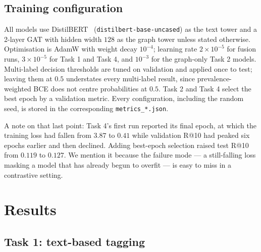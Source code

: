 \documentclass[conference]{IEEEtran}
\begin{document}
\subsection{Training configuration}
All models use DistilBERT~\cite{distilbert} (\texttt{distilbert-base-uncased}) as the text tower
and a 2-layer GAT with hidden width $128$ as the graph tower unless stated
otherwise. Optimisation is AdamW with weight decay $10^{-4}$; learning rate
$2\times10^{-5}$ for fusion runs, $3\times10^{-5}$ for Task 1 and Task 4, and
$10^{-3}$ for the graph-only Task 2 models. Multi-label decision thresholds are
tuned on validation and applied once to test; leaving them at $0.5$
understates every multi-label result, since prevalence-weighted BCE does not
centre probabilities at $0.5$. Task 2 and Task 4 select the best epoch by a
validation metric. Every configuration, including the random seed, is stored in
the corresponding \texttt{metrics\_*.json}.

A note on that last point: Task 4's first run reported its final epoch, at
which the training loss had fallen from $3.87$ to $0.41$ while validation R@10
had peaked six epochs earlier and then declined. Adding best-epoch selection
raised test R@10 from $0.119$ to $0.127$. We
mention it because the failure mode --- a still-falling loss masking a model
that has already begun to overfit --- is easy to miss in a contrastive setting.

\section{Results}

\subsection{Task 1: text-based tagging}
\label{sec:t1results}
\end{document}
